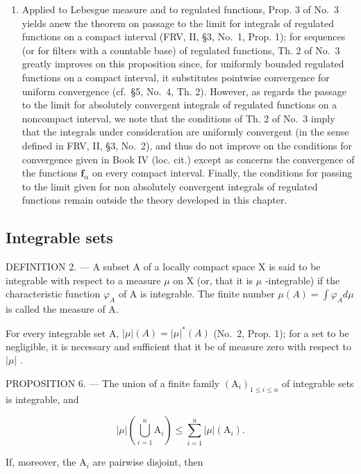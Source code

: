 \begin{enumerate}
\def\labelenumi{\arabic{enumi})}
\setcounter{enumi}{1}
\tightlist
\item
  Applied to Lebesgue measure and to regulated functions, Prop. 3 of No.~3 yields anew the theorem on passage to the limit for integrals of regulated functions on a compact interval (FRV, II, §3, No.~1, Prop. 1); for sequences (or for filters with a countable base) of regulated functions, Th. 2 of No.~3 greatly improves on this proposition since, for uniformly bounded regulated functions on a compact interval, it substitutes pointwise convergence for uniform convergence (cf.~§5, No.~4, Th. 2). However, as regards the passage to the limit for absolutely convergent integrals of regulated functions on a noncompact interval, we note that the conditions of Th. 2 of No.~3 imply that the integrals under consideration are uniformly convergent (in the sense defined in FRV, II, §3, No.~2), and thus do not improve on the conditions for convergence given in Book IV (loc. cit.) except as concerns the convergence of the functions \(\mathbf{f}_{\alpha}\) on every compact interval. Finally, the conditions for passing to the limit given for non absolutely convergent integrals of regulated functions remain outside the theory developed in this chapter.
\end{enumerate}

\subsection{Integrable sets}

DEFINITION 2. --- A subset A of a locally compact space X is said to be integrable with respect to a measure \(\mu\) on X (or, that it is \(\mu\) -integrable) if the characteristic function \(\varphi_{A}\) of A is integrable. The finite number \(\mu(A) = \int \varphi_{A} d\mu\) is called the measure of A.

For every integrable set A, \(|\mu|(A) = |\mu|^{*}(A)\) (No.~2, Prop. 1); for a set to be negligible, it is necessary and sufficient that it be of measure zero with respect to \(|\mu|\) .

PROPOSITION 6. --- The union of a finite family \((\mathrm{A}_{i})_{1\leqslant i\leqslant n}\) of integrable sets is integrable, and

\[
| \mu | \left(\bigcup_ {i = 1} ^ {n} \mathrm{A} _ {i}\right) \leqslant \sum_ {i = 1} ^ {n} | \mu | (\mathrm{A} _ {i}).\tag{13}
\]

If, moreover, the \(\mathrm{A}_i\) are pairwise disjoint, then

